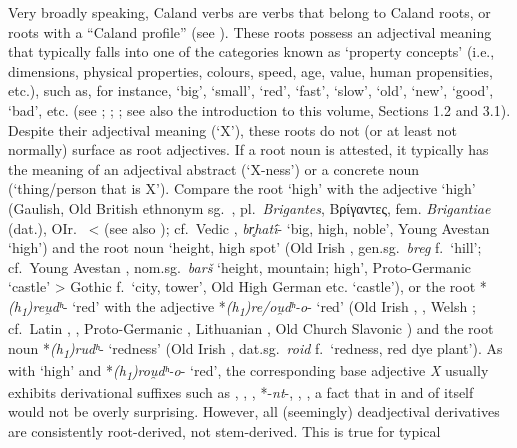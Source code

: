 \documentclass[output=paper,colorlinks,citecolor=brown]{langscibook}
\begin{document}
Very broadly speaking, Caland verbs are verbs that belong to Caland roots, or roots with a “Caland profile”   (see \citealt{Nussbaum2022}). These roots possess an adjectival meaning  that typically falls into one of the categories known as ‘property concepts’ (i.e., dimensions, physical properties, colours, speed, age, value, human propensities, etc.), such as, for instance, ‘big’, ‘small’, ‘red’, ‘fast’, ‘slow’, ‘old’, ‘new’, ‘good’, ‘bad’, etc. (see \citealt[78--79]{Rau2009}; \citealt[18--20]{Balles2003}; \citealt[269--287]{Balles2006}; see also the introduction to this volume, Sections 1.2 and 3.1). Despite their adjectival meaning  (‘X’), these roots do not (or at least not normally) surface as root adjectives. If a root noun is attested, it typically has the meaning of an adjectival abstract (‘X-ness’) or a concrete noun (‘thing/person that is X’). Compare the root  ‘high’ with the adjective  ‘high’ (Gaulish, Old British ethnonym sg.\ , pl.\ \textit{Brigantes}, Βρίγαντες, fem. \textit{Brigantiae} (dat.), OIr.\  <  (see also \citealt{Stifterforth}); cf.\ Vedic , \textit{br̥hatī́}- ‘big, high, noble’, Young Avestan  ‘high’) and the root noun  ‘height, high spot’ (Old Irish , gen.sg.\ \textit{breg} f.\ ‘hill’; cf.\ Young Avestan , nom.sg.\ \textit{barš} ‘height, mountain; high’, Proto-Germanic  ‘castle’ > Gothic  f.\ ‘city, tower’, Old High German  etc. ‘castle’), or the root *\textit{(h\textsubscript{1})reu̯dʰ}-   ‘red’ with the adjective *\textit{(h\textsubscript{1})re/ou̯dʰ-o}-  ‘red’ (Old Irish , , Welsh ; cf.\ Latin , , Proto-Germanic , Lithuanian , Old Church Slavonic ) and the root noun *\textit{(h\textsubscript{1})rudʰ}-   ‘redness’ (Old Irish , dat.sg.\ \textit{roid} f.\ ‘redness, red dye plant’). As with  ‘high’ and *\textit{(h\textsubscript{1})rou̯dʰ-o}- ‘red’, the corresponding base adjective \textit{X} usually exhibits derivational suffixes such as \mbox{,} \mbox{}, \mbox{}, \mbox{*-\textit{nt}-}, \mbox{}, \mbox{}, a fact that in and of itself would not be overly surprising. However, all (seemingly) deadjectival  derivatives are consistently root-derived, not stem-derived. This is true for typical 
\end{document}
